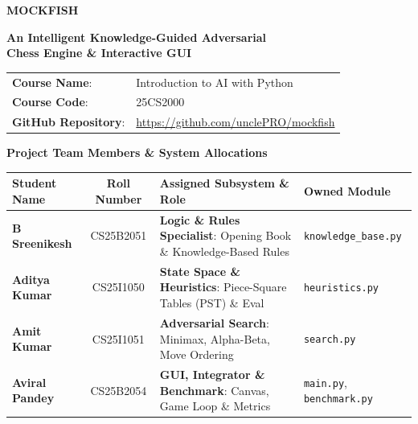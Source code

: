 \documentclass[11pt,a4paper]{article}
\begin{document}
\begin{titlepage}
    \centering
    \vspace*{1.5cm}
    {\Huge\bfseries\color{primaryblue} MOCKFISH \par}
    \vspace{0.4cm}
    {\LARGE\bfseries\color{darkslate} An Intelligent Knowledge-Guided Adversarial \\ Chess Engine \& Interactive GUI \par}
    \vspace{1.5cm}
    \colorbox{lightgraybg}{
        \begin{minipage}{0.88\textwidth}
        \vspace{0.35cm}
        \centering
        \renewcommand{\arraystretch}{1.45}
        \begin{tabular}{ll}
            \textbf{Course Name}: & Introduction to AI with Python \\
            \textbf{Course Code}: & 25CS2000 \\
            \textbf{GitHub Repository}: & \url{https://github.com/unclePRO/mockfish} \\
        \end{tabular}
        \vspace{0.35cm}
        \end{minipage}
    }
    \vspace{1.5cm}
    {\large\bfseries\color{primaryblue} Project Team Members \& System Allocations \par}
    \vspace{0.4cm}
    \renewcommand{\arraystretch}{1.35}
    \begin{tabularx}{0.96\textwidth}{l c Y l}
        \toprule
        \textbf{Student Name} & \textbf{Roll Number} & \textbf{Assigned Subsystem \& Role} & \textbf{Owned Module} \\
        \midrule
        \textbf{B Sreenikesh} & CS25B2051 & \textbf{Logic \& Rules Specialist}: Opening Book \& Knowledge-Based Rules & \texttt{knowledge\_base.py} \\
        \textbf{Aditya Kumar} & CS25I1050 & \textbf{State Space \& Heuristics}: Piece-Square Tables (PST) \& Eval & \texttt{heuristics.py} \\
        \textbf{Amit Kumar}   & CS25I1051 & \textbf{Adversarial Search}: Minimax, Alpha-Beta, Move Ordering & \texttt{search.py} \\
        \textbf{Aviral Pandey}& CS25B2054 & \textbf{GUI, Integrator \& Benchmark}: Canvas, Game Loop \& Metrics & \texttt{main.py}, \texttt{benchmark.py} \\
        \bottomrule
    \end{tabularx}
    \vfill
\end{titlepage}
\setcounter{page}{2}
\end{document}
